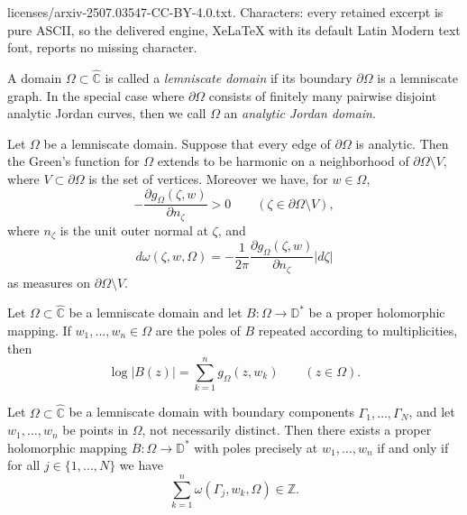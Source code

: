 \documentclass[10pt,a4paper]{amsart}
\newcommand{\hC}{\widehat{\mathbb{C}}}
\newcommand{\mD}{\mathbb{D}}
\newcommand{\mZ}{\mathbb{Z}}
\begin{document}
licenses/arxiv-2507.03547-CC-BY-4.0.txt. Characters: every retained excerpt is pure ASCII, so the delivered engine, XeLaTeX with its default Latin Modern text font, reports no missing character.
\begin{definition}
\label{lemniscatedomain}
A domain $\Omega \subset \hC$ is called a \textit{lemniscate domain} if its boundary $\partial \Omega$ is a lemniscate graph. In the special case where $\partial \Omega$ consists of finitely many pairwise disjoint analytic Jordan curves, then we call $\Omega$ an \textit{analytic Jordan domain}.
\end{definition}

\begin{proposition}
\label{extension}
Let $\Omega$ be a lemniscate domain. Suppose that every edge of $\partial \Omega$ is analytic. Then the Green's function for $\Omega$ extends to be harmonic on a neighborhood of $\partial \Omega \setminus V$, where $V \subset \partial \Omega$ is the set of vertices. Moreover we have, for $w \in \Omega$,
$$-\frac{\partial g_\Omega (\zeta , w )}{\partial n_\zeta} > 0 \qquad (\zeta \in \partial \Omega \setminus V),$$
where $n_\zeta$ is the unit outer normal at $\zeta$, and
$$d\omega(\zeta,w,\Omega) = -\frac{1}{2\pi} \frac{\partial g_\Omega (\zeta , w)}{\partial n_\zeta} |d\zeta|$$
as measures on $\partial \Omega \setminus V$.
\end{proposition}

\begin{proposition}
\label{proper1}
Let $\Omega \subset \hC$ be a lemniscate domain and let $B:\Omega \to \mD^*$ be a proper holomorphic mapping. If $w_1, \dots, w_n \in \Omega$ are the poles of $B$ repeated according to multiplicities, then
$$
\log{|B(z)|} = \sum_{k=1}^n g_{\Omega}(z,w_k) \qquad (z \in \Omega).
$$
\end{proposition}

\begin{proposition}
\label{proper2}
Let $\Omega \subset \hC$ be a lemniscate domain with boundary components $\Gamma_1, \dots, \Gamma_N$, and let $w_1, \dots, w_n$ be points in $\Omega$, not necessarily distinct. Then there exists a proper holomorphic mapping $B:\Omega \to \mD^*$ with poles precisely at $w_1, \dots, w_n$ if and only if for all $j \in \{1, \dots, N\}$ we have
\begin{equation}
\label{eqhm}
\sum_{k=1}^n \omega(\Gamma_j, w_k, \Omega) \in \mZ.
\end{equation}


\end{proposition}
\end{document}
